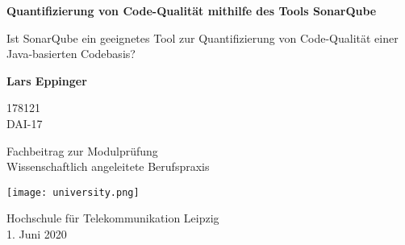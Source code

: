 \begin{titlepage}
    \begin{center}
        \vspace*{1cm}
        
        \Huge
        \textbf{Quantifizierung von Code-Qualität mithilfe des Tools SonarQube}
        
        \vspace{0.5cm}
        \LARGE
        Ist SonarQube ein geeignetes Tool zur Quantifizierung von Code-Qualität einer Java-basierten Codebasis?
        
        \vspace{1.5cm}
        
        \textbf{Lars Eppinger}

        \Large
        178121\\
        DAI-17
        
        \vfill
        
        Fachbeitrag zur Modulprüfung\\Wissenschaftlich angeleitete Berufspraxis
        
        \vspace{0.8cm}
        
        \texttt{[image: university.png]}
        
        \Large
        Hochschule für Telekommunikation Leipzig\\
        1. Juni 2020
        
    \end{center}
\end{titlepage}